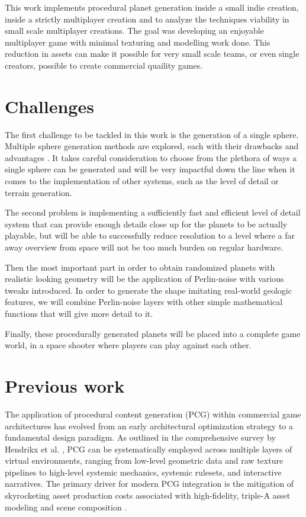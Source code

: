 \documentclass[12pt]{report}
\begin{document}
This work implements procedural planet generation inside a small indie creation, inside a strictly multiplayer creation and to analyze the techniques viability in small scale multiplayer creations. The goal was developing an enjoyable multiplayer game with minimal texturing and modelling work done. This reduction in assets can make it possible for very small scale teams, or even single creators, possible to create commercial quaility games.

\section{Challenges}

The first challenge to be tackled in this work is the generation of a single sphere. Multiple sphere generation methods are explored, each with their drawbacks and advantages \cite{doliveira2018} . It takes careful consideration to choose from the plethora of ways a single sphere can be generated and will be very impactful down the line when it comes to the implementation of other systems, such as the level of detail or terrain generation.

The second problem is implementing a sufficiently fast and efficient level of detail system that can provide enough details close up for the planets to be actually playable, but will be able to successfully reduce resolution to a level where a far away overview from space will not be too much burden on regular hardware.

Then the most important part in order to obtain randomized planets with realistic looking geometry will be the application of Perlin-noise with various tweaks introduced. In order to generate the shape imitating real-world geologic features, we will combine Perlin-noise layers with other simple mathematical functions that will give more detail to it.

Finally, these procedurally generated planets will be placed into a complete game world, in a space shooter where players can play against each other.

\section{Previous work}

The application of procedural content generation (PCG) within commercial game architectures has evolved from an early architectural optimization strategy to a fundamental design paradigm. As outlined in the comprehensive survey by Hendrikx et al. \cite{hendrikx2013}, PCG can be systematically employed across multiple layers of virtual environments, ranging from low-level geometric data and raw texture pipelines to high-level systemic mechanics, systemic rulesets, and interactive narratives. The primary driver for modern PCG integration is the mitigation of skyrocketing asset production costs associated with high-fidelity, triple-A asset modeling and scene composition \cite{smelik2014}. 
\end{document}
